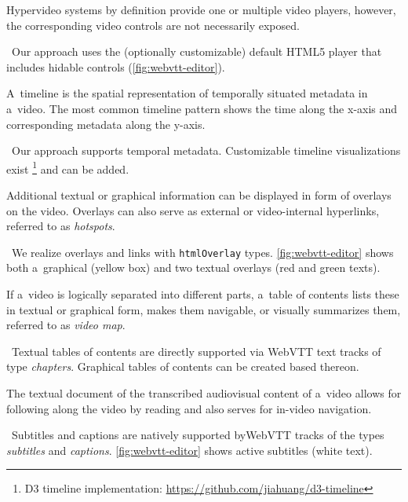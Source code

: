 \documentclass{sig-alternate-ceur}
\newcommand{\inlinelistingsize}{\fontsize{8pt}{11pt}}
\let\oldurl\url
\renewcommand{\url}[1]{\inlinelistingsize\oldurl{#1}}
\begin{document}
\begin{description}[leftmargin=*]
  \item[Video player and controls] Hypervideo systems by definition
  provide one or multiple video players, however,
  the corresponding video controls are not necessarily exposed.

  \checkmark~Our approach uses the (optionally customizable)
  default HTML5 player that includes hidable controls
  (\autoref{fig:webvtt-editor}).

  \item[Timeline] A~timeline is the spatial representation
  of temporally situated metadata in a~video.
  The most common timeline pattern shows the
  time along the x-axis and corresponding metadata along the y-axis.
  
  \checkmark~Our approach supports temporal metadata.
  Customizable timeline visualizations exist%
  \footnote{D3 timeline implementation:
  \url{https://github.com/jiahuang/d3-timeline}}
  and can be added.

  \item[Textual or graphical overlay]
  Additional textual or gra\-phical
  information can be displayed in form of overlays on the video.
  Overlays can also serve as external or video-internal hyperlinks,
  referred to as \emph{hotspots}.

  \checkmark~We realize overlays and links
  with \texttt{htmlOverlay} types.
  \autoref{fig:webvtt-editor} shows both a~graphical (yellow box)
  and two textual overlays (red and green texts).

  \item[Textual or graphical table of contents]
  If a~video is logically separated
  into different parts, a~table of contents lists these
  in textual or graphical form, makes them navigable,
  or visually summarizes them, referred to as \emph{video map}.
  
  \checkmark~Textual tables of contents are directly supported
  via WebVTT text tracks of type \emph{chapters}.
  Graphical tables of contents can be created based thereon.  

  \item[Transcript] The textual document
  of the transcribed audiovisual content of a~video
  allows for following along the video by reading
  and also serves for in-video navigation.
  
  \checkmark~Subtitles and captions are natively supported
  by\linebreak WebVTT tracks of the types \emph{subtitles} and \emph{captions}.
  \autoref{fig:webvtt-editor} shows active subtitles (white text).
\end{description}
\end{document}
